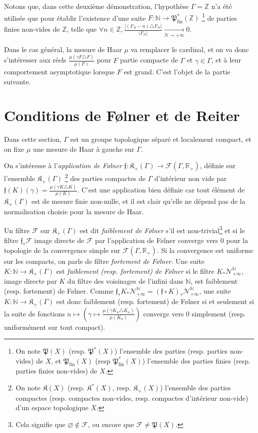 \documentclass[a4paper,12pt]{article}
\newcommand{\R}{\mathbb{R}}
\newcommand{\N}{\mathbb{N}}
\newcommand{\Z}{\mathbb{Z}}
\newcommand{\abs}[1]{\left\vert#1\right\vert}
\newcommand{\card}[1]{\abs{#1}}
\newcommand{\ssi}{si et seulement si }
\newcommand{\comp}{\circ}
\newcommand{\nhds}{\mathcal{N}}
\newcommand{\parts}{\mathfrak{P}}
\newcommand{\finparts}{\mathfrak{P}_{\mathrm{fin}}}
\begin{document}
Notons que, dans cette deuxième démonstration, l'hypothèse $\Gamma=\Z$ n'a été utilisée que pour établir l'existence d'une suite $F:\N\to\finparts^*(\Z)$ 
    \footnote{On note $\parts(X)$ (resp. $\parts^*(X)$) l'ensemble des parties (resp. parties non-vides) de $X$, et $\finparts(X)$ (resp $\finparts^*(X)$) 
    l'ensemble des parties finies (resp. parties finies non-vides) de $X$.}
de parties finies non-vides de $\Z$,
telle que $\forall n\in\Z, \frac{\card{(F_N-n)\triangle F_N}}{\card{F_N}} \xrightarrow[N\to+\infty]{} 0$. 

Dans le cas général, la mesure de Haar $\mu$ va remplacer le cardinal, et on va donc s'intéresser aux réels $\frac{\mu(\gamma F \triangle F)}{\mu(F)}$ 
pour $F$ partie compacte de $\Gamma$ et $\gamma\in\Gamma$, et à leur comportement asymptotique
lorsque $F$ est grand. C'est l'objet de la partie suivante.

\section{Conditions de F\o{}lner et de Reiter}

Dans cette section, $\Gamma$ est un groupe topologique séparé et localement compact, et on fixe 
$\mu$ une mesure de Haar à gauche sur $\Gamma$.

On s'intéresse à l'\emph{application de F\o{}lner} $\mathfrak{f} : \mathfrak{K}_+(\Gamma) \to \mathcal{F}(\Gamma, \R_+)$, définie sur l'ensemble 
$\mathfrak{K}_+(\Gamma)$
\footnote{On note $\mathfrak{K}(X)$ (resp. $\mathfrak{K}^*(X)$, resp. $\mathfrak{K}_+(X)$) l'ensemble des parties compactes 
(resp. compactes non-vides, resp. compactes d'intérieur non-vide) d'un espace topologique $X$. }
des parties compactes de $\Gamma$ d'intérieur non vide par $\mathfrak{f}(K)(\gamma) = \frac{\mu(\gamma K \triangle K)}{\mu(K)}$.
C'est une application bien définie car tout élément de $\mathfrak{K}_+(\Gamma)$ est de mesure finie non-nulle,
et il est clair qu'elle ne dépend pas de la normalisation choisie pour la mesure de Haar.

Un filtre $\mathscr{F}$ sur $\mathfrak{K}_+(\Gamma)$ est dit \emph{faiblement de F\o{}lner} s'il est non-trivial\footnote{Cela signifie que $\varnothing\notin\mathscr{F}$,
ou encore que $\mathscr{F}\ne\parts(X)$.} et si le filtre $\mathfrak{f}_*\mathscr{F}$ image directe 
de $\mathscr{F}$ par l'application de F\o{}lner converge vers $0$ pour la topologie de la convergence simple sur $\mathcal{F}(\Gamma, \R_+)$. 
Si la convergence est uniforme sur les compacts, on parle de filtre \emph{fortement de F\o{}lner}.
Une suite $K:\N\to\mathfrak{K}_+(\Gamma)$ est \emph{faiblement (resp. fortement) de F\o{}lner} si le filtre $K_*\nhds_{+\infty}^\N$, image directe par $K$ du filtre des
voisinages de l'infini dans $\N$, est faiblement (resp. fortement) de F\o{}lner. Comme $\mathfrak{f}_*K_*\nhds_{+\infty}^\N = (\mathfrak{f}\comp K)_*\nhds_{+\infty}^\N$,
une suite $K:\N\to\mathfrak{K}_+(\Gamma)$ est donc faiblement (resp. fortement) de F\o{}lner \ssi la suite de fonctions
$n\mapsto\left(\gamma\mapsto\frac{\mu(\gamma K_n\triangle K_n)}{\mu(K_n)}\right)$ converge vers $0$ simplement 
(resp. uniformément sur tout compact).
\end{document}
